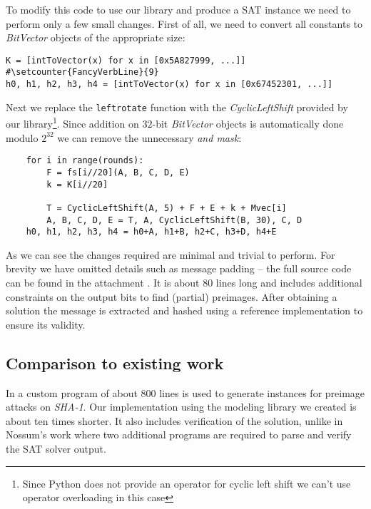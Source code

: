 To modify this code to use our library and produce a SAT instance we need to perform only a few small changes.
First of all, we need to convert all constants to \emph{BitVector} objects of the appropriate size:

\begin{verbatim}
K = [intToVector(x) for x in [0x5A827999, ...]]                                 #\setcounter{FancyVerbLine}{9}
h0, h1, h2, h3, h4 = [intToVector(x) for x in [0x67452301, ...]]
\end{verbatim}

Next we replace the \texttt{leftrotate} function with the \emph{CyclicLeftShift} provided by our library\footnote{Since Python does not provide an operator for cyclic left shift we can't use operator overloading in this case}.
Since addition on $32$-bit \emph{BitVector} objects is automatically done modulo $2^{32}$ we can remove the unnecessary \emph{and mask}:
\begin{verbatim}
    for i in range(rounds):
        F = fs[i//20](A, B, C, D, E)
        k = K[i//20]

        T = CyclicLeftShift(A, 5) + F + E + k + Mvec[i]
        A, B, C, D, E = T, A, CyclicLeftShift(B, 30), C, D
    h0, h1, h2, h3, h4 = h0+A, h1+B, h2+C, h3+D, h4+E
\end{verbatim}

As we can see the changes required are minimal and trivial to perform.
For brevity we have omitted details such as message padding -- the full source code can be found in the attachment \cite{papay2016code}.
It is about 80 lines long and includes additional constraints on the output bits to find (partial) preimages.
After obtaining a solution the message is extracted and hashed using a reference implementation to ensure its validity.

\subsection{Comparison to existing work}
In \cite{nossum2012sat} a custom program of about $800$ lines is used to generate instances for preimage attacks on \emph{SHA-1}.
Our implementation using the modeling library we created is about ten times shorter.
It also includes verification of the solution, unlike in Nossum's work where two additional programs are required to parse and verify the SAT solver output.

